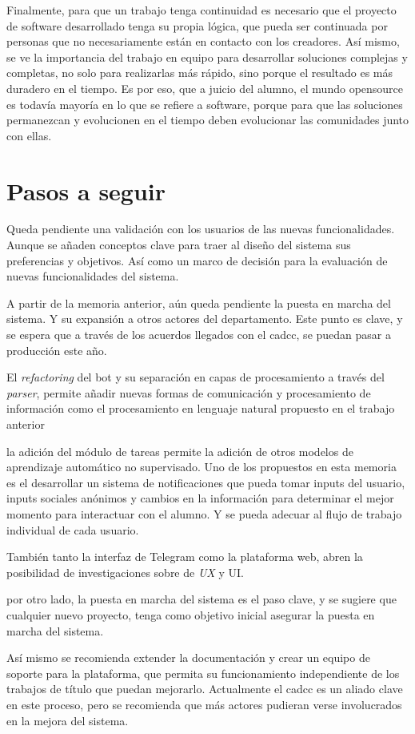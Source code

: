 \par Finalmente, para que un trabajo tenga continuidad es necesario que el proyecto de software desarrollado tenga su propia lógica, que pueda ser continuada por personas que no necesariamente están en contacto con los creadores. Así mismo, se ve la importancia del trabajo en equipo para desarrollar soluciones complejas y completas, no solo para realizarlas más rápido, sino porque el resultado es más duradero en el tiempo. Es por eso, que a juicio del alumno, el mundo opensource es todavía mayoría en lo que se refiere a software, porque para que las soluciones permanezcan y evolucionen en el tiempo deben evolucionar las comunidades junto con ellas.

\section{Pasos a seguir}
    \par Queda pendiente una validación con los usuarios de las nuevas funcionalidades. Aunque se añaden conceptos clave para traer al diseño del sistema sus preferencias y objetivos. Así como un marco de decisión para la evaluación de nuevas funcionalidades del sistema.
    \par A partir de la memoria anterior, aún queda pendiente la puesta en marcha del sistema. Y su expansión a otros actores del departamento. Este punto es clave, y se espera que a través de los acuerdos llegados con el \acrshort{cadcc}, se puedan pasar a producción este año.
    \par El \textit{refactoring} del bot y su separación en capas de procesamiento a través del \textit{parser}, permite añadir nuevas formas de comunicación y procesamiento de información como el procesamiento en lenguaje natural propuesto en el trabajo anterior \cite{ARANCIBIA2021}
    \par la adición del módulo de tareas permite la adición de otros modelos de aprendizaje automático no supervisado. Uno de los propuestos en esta memoria es el desarrollar un sistema de notificaciones que pueda tomar inputs del usuario, inputs sociales anónimos y cambios en la información para determinar el mejor momento para interactuar con el alumno. Y se pueda adecuar al flujo de trabajo individual de cada usuario.
    \par También tanto la interfaz de \gls{Telegram} como la plataforma web, abren la posibilidad de investigaciones sobre de \textit{UX} y {UI}.
    \par por otro lado, la puesta en marcha del sistema es el paso clave, y se sugiere que cualquier nuevo proyecto, tenga como objetivo inicial asegurar la puesta en marcha del sistema. 
    \par Así mismo se recomienda extender la documentación y crear un equipo de soporte para la plataforma, que permita su funcionamiento independiente de los trabajos de título que puedan mejorarlo. Actualmente el \acrshort{cadcc} es un aliado clave en este proceso, pero se recomienda que más actores pudieran verse involucrados en la mejora del sistema.
